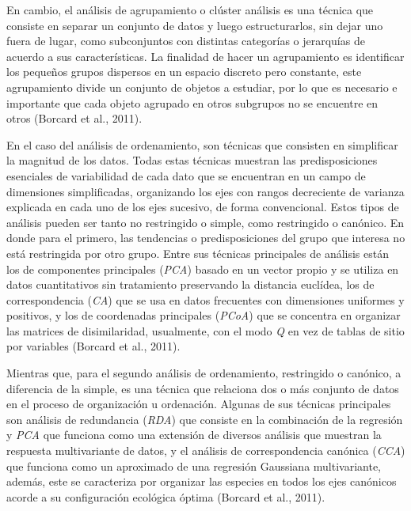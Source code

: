 \documentclass[11pt,]{article}
\begin{document}
En cambio, el análisis de agrupamiento o clúster análisis es una técnica
que consiste en separar un conjunto de datos y luego estructurarlos, sin
dejar uno fuera de lugar, como subconjuntos con distintas categorías o
jerarquías de acuerdo a sus características. La finalidad de hacer un
agrupamiento es identificar los pequeños grupos dispersos en un espacio
discreto pero constante, este agrupamiento divide un conjunto de objetos
a estudiar, por lo que es necesario e importante que cada objeto
agrupado en otros subgrupos no se encuentre en otros (Borcard et al.,
2011).

En el caso del análisis de ordenamiento, son técnicas que consisten en
simplificar la magnitud de los datos. Todas estas técnicas muestran las
predisposiciones esenciales de variabilidad de cada dato que se
encuentran en un campo de dimensiones simplificadas, organizando los
ejes con rangos decreciente de varianza explicada en cada uno de los
ejes sucesivo, de forma convencional. Estos tipos de análisis pueden ser
tanto no restringido o simple, como restringido o canónico. En donde
para el primero, las tendencias o predisposiciones del grupo que
interesa no está restringida por otro grupo. Entre sus técnicas
principales de análisis están los de componentes principales
(\emph{PCA}) basado en un vector propio y se utiliza en datos
cuantitativos sin tratamiento preservando la distancia euclídea, los de
correspondencia (\emph{CA}) que se usa en datos frecuentes con
dimensiones uniformes y positivos, y los de coordenadas principales
(\emph{PCoA}) que se concentra en organizar las matrices de
disimilaridad, usualmente, con el modo \emph{Q} en vez de tablas de
sitio por variables (Borcard et al., 2011).

Mientras que, para el segundo análisis de ordenamiento, restringido o
canónico, a diferencia de la simple, es una técnica que relaciona dos o
más conjunto de datos en el proceso de organización u ordenación.
Algunas de sus técnicas principales son análisis de redundancia
(\emph{RDA}) que consiste en la combinación de la regresión y \emph{PCA}
que funciona como una extensión de diversos análisis que muestran la
respuesta multivariante de datos, y el análisis de correspondencia
canónica (\emph{CCA}) que funciona como un aproximado de una regresión
Gaussiana multivariante, además, este se caracteriza por organizar las
especies en todos los ejes canónicos acorde a su configuración ecológica
óptima (Borcard et al., 2011).
\end{document}

